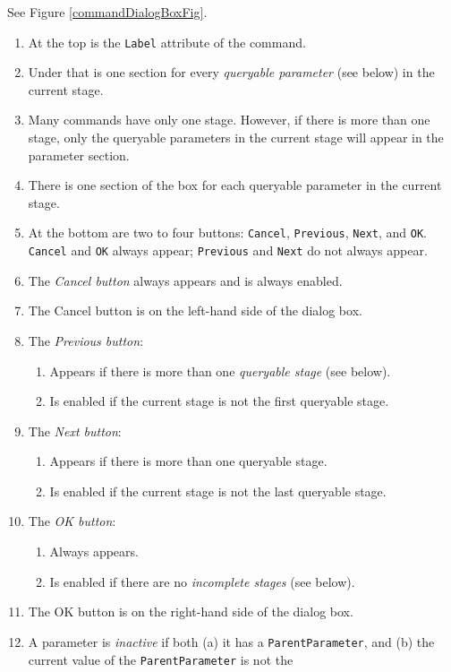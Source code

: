 \documentclass[11pt]{article}
\begin{document}
See Figure \ref{commandDialogBoxFig}.
\begin{enumerate}
\item At the top is the {\tt Label} attribute of the command.
\item Under that is one section for every {\it queryable parameter}
  (see below) in the current stage.
\item Many commands have only one stage.  However, if there is
  more than one stage, only the queryable parameters in the current stage
  will appear in the parameter section.
\item There is one section of the box for each queryable parameter in the
  current stage.
\item At the bottom are two to four buttons: {\tt Cancel}, {\tt Previous},
  {\tt Next}, and {\tt OK}.  {\tt Cancel} and {\tt OK} always appear;
  {\tt Previous} and {\tt Next} do not always appear.
\item The {\it Cancel button} always appears and is always enabled.
\item The Cancel button is on the left-hand side of the dialog box.
\item The {\it Previous button}:
  \begin{enumerate}
  \item Appears if there is more than one {\it queryable stage} (see below).
  \item Is enabled if the current stage is not the first queryable stage.
  \end{enumerate}
\item The {\it Next button}:
  \begin{enumerate}
  \item Appears if there is more than one queryable stage.
  \item Is enabled if the current stage is not the last queryable stage.
  \end{enumerate}
\item The {\it OK button}:
  \begin{enumerate}
  \item Always appears.
  \item Is enabled if there are no {\it incomplete stages} (see below).
  \end{enumerate}
\item The OK button is on the right-hand side of the dialog box.
\item A parameter is {\it inactive} if both (a) it has a {\tt ParentParameter},
  and (b) the current value of the {\tt ParentParameter} is not the

\end{enumerate}
\end{document}
